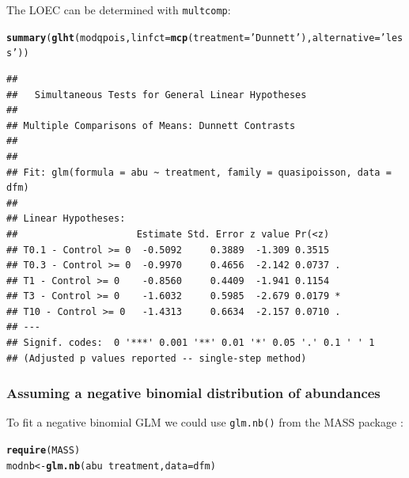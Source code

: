 \documentclass{scrartcl}\usepackage[]{graphicx}\usepackage[]{color}
\makeatletter
\newcommand{\hlstr}[1]{\textcolor[rgb]{0.192,0.494,0.8}{#1}}%
\newcommand{\hlopt}[1]{\textcolor[rgb]{0,0,0}{#1}}%
\newcommand{\hlstd}[1]{\textcolor[rgb]{0.345,0.345,0.345}{#1}}%
\newcommand{\hlkwb}[1]{\textcolor[rgb]{0.69,0.353,0.396}{#1}}%
\newcommand{\hlkwc}[1]{\textcolor[rgb]{0.333,0.667,0.333}{#1}}%
\newcommand{\hlkwd}[1]{\textcolor[rgb]{0.737,0.353,0.396}{\textbf{#1}}}%
\newenvironment{kframe}{%
 \def\at@end@of@kframe{}%
 \ifinner\ifhmode%
  \def\at@end@of@kframe{\end{minipage}}%
  \begin{minipage}{\columnwidth}%
 \fi\fi%
 \def\FrameCommand##1{\hskip\@totalleftmargin \hskip-\fboxsep
 \colorbox{shadecolor}{##1}\hskip-\fboxsep
     \hskip-\linewidth \hskip-\@totalleftmargin \hskip\columnwidth}%
 \MakeFramed {\advance\hsize-\width
   \@totalleftmargin\z@ \linewidth\hsize
   \@setminipage}}%
 {\par\unskip\endMakeFramed%
 \at@end@of@kframe}
\newenvironment{knitrout}{}{} %
\makeatother
\begin{document}
The LOEC can be determined with \texttt{multcomp}:
\begin{knitrout}
\color{fgcolor}\begin{kframe}
\begin{alltt}
\hlkwd{summary}\hlstd{(}\hlkwd{glht}\hlstd{(modqpois,} \hlkwc{linfct} \hlstd{=} \hlkwd{mcp}\hlstd{(}\hlkwc{treatment} \hlstd{=} \hlstr{'Dunnett'}\hlstd{),}  \hlkwc{alternative} \hlstd{=} \hlstr{'less'}\hlstd{))}
\end{alltt}
\begin{verbatim}
## 
## 	 Simultaneous Tests for General Linear Hypotheses
## 
## Multiple Comparisons of Means: Dunnett Contrasts
## 
## 
## Fit: glm(formula = abu ~ treatment, family = quasipoisson, data = dfm)
## 
## Linear Hypotheses:
##                     Estimate Std. Error z value Pr(<z)  
## T0.1 - Control >= 0  -0.5092     0.3889  -1.309 0.3515  
## T0.3 - Control >= 0  -0.9970     0.4656  -2.142 0.0737 .
## T1 - Control >= 0    -0.8560     0.4409  -1.941 0.1154  
## T3 - Control >= 0    -1.6032     0.5985  -2.679 0.0179 *
## T10 - Control >= 0   -1.4313     0.6634  -2.157 0.0710 .
## ---
## Signif. codes:  0 '***' 0.001 '**' 0.01 '*' 0.05 '.' 0.1 ' ' 1
## (Adjusted p values reported -- single-step method)
\end{verbatim}
\end{kframe}
\end{knitrout}



\subsubsection{Assuming a negative binomial distribution of abundances}
To fit a negative binomial GLM we could use \texttt{glm.nb()} from the MASS package \citep{venables_modern_2002}:
\begin{knitrout}
\color{fgcolor}\begin{kframe}
\begin{alltt}
\hlkwd{require}\hlstd{(MASS)}
\hlstd{modnb} \hlkwb{<-} \hlkwd{glm.nb}\hlstd{(abu} \hlopt{~} \hlstd{treatment,} \hlkwc{data} \hlstd{= dfm)}
\end{alltt}
\end{kframe}
\end{knitrout}
\end{document}
